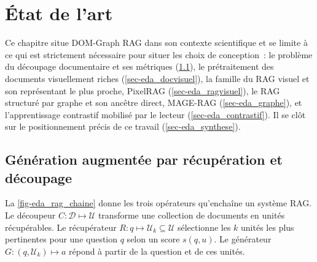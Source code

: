 \chapter{État de l'art}
\label{chap-etat_de_lart}

Ce chapitre situe DOM-Graph RAG dans son contexte scientifique et se limite à ce qui est strictement nécessaire pour situer les choix de conception~:
le problème du découpage documentaire et ses métriques
(\cref{sec-eda_rag}), le prétraitement des documents visuellement riches
(\cref{sec-eda_docvisuel}), la famille du RAG visuel et son représentant le
plus proche, PixelRAG (\cref{sec-eda_ragvisuel}), le RAG structuré par graphe
et son ancêtre direct, MAGE-RAG (\cref{sec-eda_graphe}), et l'apprentissage
contrastif mobilisé par le lecteur (\cref{sec-eda_contrastif}). Il se clôt sur
le positionnement précis de ce travail (\cref{sec-eda_synthese}).

\section{Génération augmentée par récupération et découpage}
\label{sec-eda_rag}

La \cref{fig-eda_rag_chaine} donne les trois opérateurs qu'enchaîne un système
RAG. Le découpeur $C : \mathcal{D} \mapsto \mathcal{U}$ transforme une
collection de documents en unités récupérables. Le récupérateur
$R : q \mapsto \mathcal{U}_k \subseteq \mathcal{U}$ sélectionne les $k$ unités
les plus pertinentes pour une question $q$ selon un score $s(q,u)$. Le
générateur $G : (q, \mathcal{U}_k) \mapsto a$ répond à partir de la question
et de ces unités.

